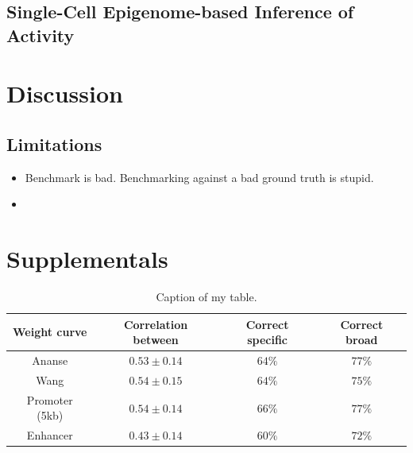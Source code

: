 \subsection{Single-Cell Epigenome-based Inference of Activity}

\section{Discussion}

\subsection{Limitations}
\begin{itemize}
    \item Benchmark is bad. Benchmarking against a bad ground truth is stupid.
    \item 
\end{itemize}

\section{Supplementals}
\beginsupplement
\begin{table}
\begin{center}
\begin{tabular}{||c c c c||} 
\hline
Weight curve & Correlation between & Correct specific & Correct broad \\[0.5ex] 
\hline
Ananse & $0.53 \pm 0.14$ & $64\%$ & $77\%$ \\ 
\hline
Wang & $0.54 \pm 0.15 $ & $64\%$ & $75\%$ \\
\hline
Promoter (5kb) & $0.54 \pm 0.14$ & $66\%$ & $77\%$ \\
\hline
Enhancer & $0.43 \pm 0.14$ & $60\%$ & $72\%$ \\
\hline
\end{tabular}
\caption{Caption of my table.}
\label{table:1}
\end{center}
\end{table}
